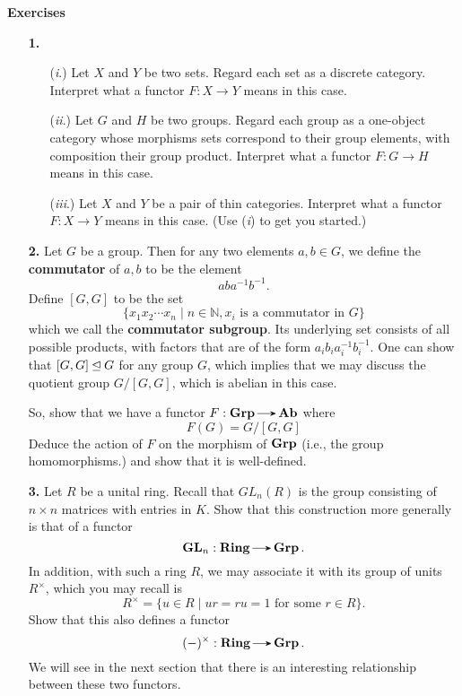     {\large \textbf{Exercises}
    \vspace{0.5cm}}
    \begin{itemize}
        \item[\textbf{1.}] 
        \begin{itemize}
            \item[(\emph{i}.)]
            Let $X$ and $Y$ be two sets. Regard each set as a discrete category. 
            Interpret what a functor $F: X \to Y$ means in this case.
            \item[(\emph{ii}.)] 
            Let $G$ and $H$ be two groups. Regard each group as a one-object 
            category whose morphisms sets correspond to their group elements, with composition 
            their group product.
            Interpret what a functor $F: G \to H$ means in this case.
            \item[(\emph{iii}.)] 
            Let $X$ and $Y$ be a pair of thin categories. Interpret 
            what a functor $F: X \to Y$ means in this case. (Use (\emph{i}) 
            to get you started.) 
        \end{itemize}
        \vspace{0.2cm}

        \item[\textbf{2.}]
        Let $G$ be a group. Then for any two elements $a, b \in G$, we
        define the \textbf{commutator} of $a, b$ to be the element 
        \[
            aba^{-1}b^{-1}.
        \]
        Define $[G, G]$ to be the set 
        \[
            \{x_1x_2\cdots x_n \mid n \in \mathbb{N}, x_i \text{ is a commutator in } G\}    
        \]
        which we call the \textbf{commutator subgroup}. Its underlying set
        consists of all possible products, with factors that are
        of the form $a_ib_ia_i^{-1}b_i^{-1}$. 
        One can show that $[G, G] \unlhd G$ for any group $G$,
        which implies that we may discuss the quotient group $G/[G, G]$,
        which is abelian in this case. 
 
        So, show that we have a functor $F: \grp \to \ab$ 
        where 
        \[
            F(G) = G/[G,G] 
        \]
        Deduce the action of $F$ on the morphism of $\operatorname{\mathbf{Grp}}$ 
        (i.e., the group homomorphisms.) and show that it is well-defined.
        \vspace{0.2cm}

        \item[\textbf{3.}]
        Let $R$ be a unital ring. Recall that $GL_n(R)$ is the group consisting of 
        $n \times n$ matrices with entries in $K$. Show that this construction more 
        generally is that of a functor
        \[
            \textbf{GL}_n: \ring \to \grp.
        \] 
        In addition, with such a ring $R$, we may associate it with 
        its group of units $R^{\times}$, which you may recall is 
        \[
            R^{\times} =\{ u \in R \mid ur = ru = 1 \text{ for some } r\in R\}.
        \]
        Show that this also defines a functor 
        \[
            (-)^{\times}: \ring \to \grp.
        \]
        We will see in the next section that there is an interesting 
        relationship between these two functors.



\end{itemize}
